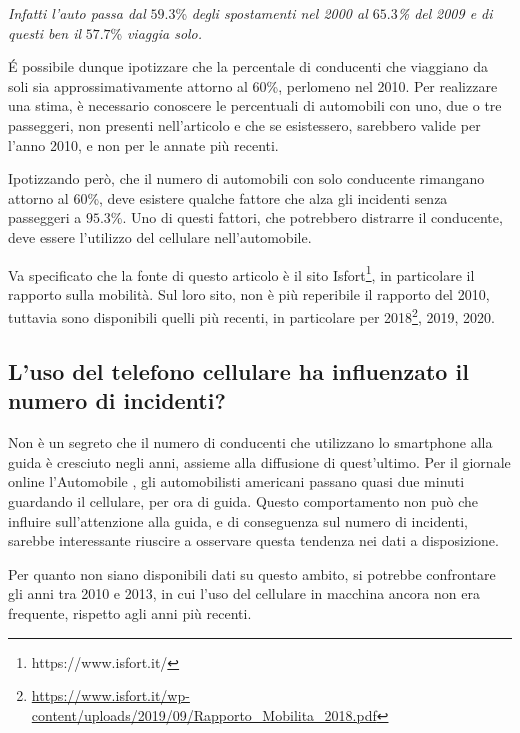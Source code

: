 \documentclass[a4paper]{report}
\newcommand{\quotestyle}[1]{\textit{#1}}
\begin{document}
\begin{center}
    \quotestyle{Infatti l’auto passa dal} $59.3$\% \quotestyle{degli spostamenti nel 2000 al $65.3$\% del }
    \quotestyle{2009 e di questi ben il} $57.7$\% 
    \quotestyle{viaggia solo.}
\end{center}

\'E possibile dunque ipotizzare che la percentale di conducenti che viaggiano 
da soli sia approssimativamente attorno al $60$\%, perlomeno nel 2010.
Per realizzare una stima, è necessario conoscere le percentuali di automobili con uno, 
due o tre passeggeri, non presenti nell'articolo e che se esistessero, sarebbero 
valide per l'anno 2010, e non per le annate più recenti.

Ipotizzando però, che il numero di automobili con solo conducente rimangano attorno al 
$60$\%, deve esistere qualche fattore che alza gli incidenti senza passeggeri a 
$95.3$\%.
Uno di questi fattori, che potrebbero distrarre il conducente, deve essere l'utilizzo 
del cellulare nell'automobile.

Va specificato che la fonte di questo articolo è il sito 
Isfort\footnote{https://www.isfort.it/}, in particolare il 
rapporto sulla mobilità.
Sul loro sito, non è più reperibile il rapporto del 2010, tuttavia sono disponibili 
quelli più recenti, in particolare per 
2018\footnote{\url{https://www.isfort.it/wp-content/uploads/2019/09/Rapporto_Mobilita_2018.pdf}}, 
2019, 2020.

\subsection{L'uso del telefono cellulare ha influenzato il numero di incidenti?}

Non è un segreto che il numero di conducenti che utilizzano lo smartphone alla guida 
è cresciuto negli anni, assieme alla diffusione di quest'ultimo. 
Per il giornale online l'Automobile \cite{AUTOMOBILE:1}, gli automobilisti americani 
passano quasi due minuti guardando il cellulare, per ora di guida.
Questo comportamento non può che influire sull'attenzione alla guida, e di conseguenza 
sul numero di incidenti, sarebbe interessante riuscire a osservare questa tendenza nei 
dati a disposizione.

Per quanto non siano disponibili dati su questo ambito, si potrebbe confrontare gli 
anni tra 2010 e 2013, in cui l'uso del cellulare in macchina ancora non era frequente, 
rispetto agli anni più recenti.
\end{document}
